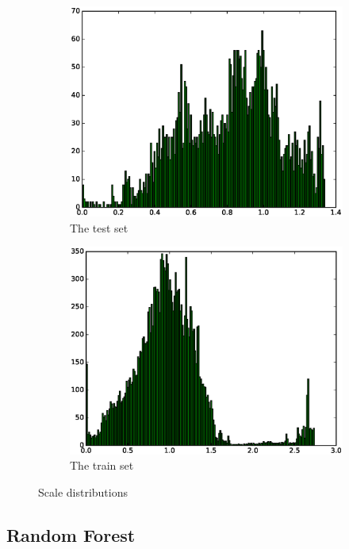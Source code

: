 \documentclass{article}
\begin{document}
\begin{figure}[!ht]
  \begin{subfigure}{0.5\textwidth}
    \includegraphics[width=0.9\linewidth]{00-scales}
    \caption{The test set}		
    \label{fig:stats-00}
  \end{subfigure}
  \begin{subfigure}{0.5\textwidth}
    \includegraphics[width=0.9\linewidth]{no_00-scales}
    \caption{The train set}
    \label{fig:stats-no_00}
  \end{subfigure}
  \caption{Scale distributions}
  \label{fig:scales}
\end{figure}

\subsection{Random Forest}
\end{document}
